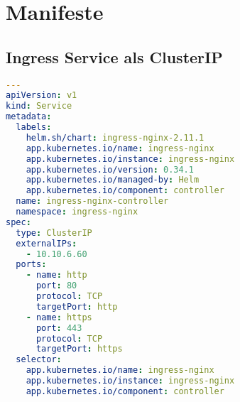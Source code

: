 \chapter{Manifeste}

\section{Ingress Service als ClusterIP}
\hfill \newline
\label{app:clusterip}
\begin{lstlisting}[language=yaml]
---
apiVersion: v1
kind: Service
metadata:
  labels:
    helm.sh/chart: ingress-nginx-2.11.1
    app.kubernetes.io/name: ingress-nginx
    app.kubernetes.io/instance: ingress-nginx
    app.kubernetes.io/version: 0.34.1
    app.kubernetes.io/managed-by: Helm
    app.kubernetes.io/component: controller
  name: ingress-nginx-controller
  namespace: ingress-nginx
spec:
  type: ClusterIP
  externalIPs:
    - 10.10.6.60
  ports:
    - name: http
      port: 80
      protocol: TCP
      targetPort: http
    - name: https
      port: 443
      protocol: TCP
      targetPort: https
  selector:
    app.kubernetes.io/name: ingress-nginx
    app.kubernetes.io/instance: ingress-nginx
    app.kubernetes.io/component: controller
\end{lstlisting}